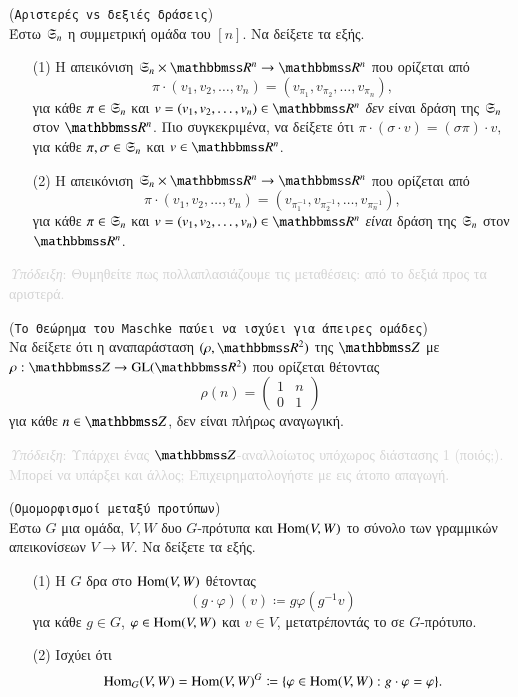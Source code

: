 \documentclass[12pt,a4paper,reqno]{amsart}
\begin{document}
\begin{exercise}{(\texttt{Αριστερές vs δεξιές δράσεις})}
    \\
    Έστω $\mathfrak{S}_n$ η συμμετρική ομάδα του $[n]$. Να δείξετε τα εξής. 
    \begin{itemize}
        \item[(1)] Η απεικόνιση $\fS_n\times\RR^n \to \RR^n$ που ορίζεται από 
        \[
        \pi\cdot(v_1, v_2, \dots, v_n) = (v_{\pi_1},v_{\pi_2}, \dots, v_{\pi_n}),
        \]
        για κάθε $\pi \in \mathfrak{S}_n$ και $v = (v_1, v_2, \dots, v_n) \in \RR^n$ \emph{δεν} είναι δράση της $\mathfrak{S}_n$ στον $\RR^n$. Πιο συγκεκριμένα, να δείξετε ότι 
        $\pi\cdot(\sigma\cdot v) = (\sigma\pi)\cdot v,$
        για κάθε $\pi, \sigma \in \mathfrak{S}_n$ και $v \in \RR^n$.
        \item[(2)] Η απεικόνιση $\fS_n\times\RR^n \to \RR^n$ που ορίζεται από 
        \[
        \pi\cdot(v_1, v_2, \dots, v_n) = (v_{\pi_1^{-1}},v_{\pi_2^{-1}}, \dots, v_{\pi_n^{-1}}),
        \]
        για κάθε $\pi \in \mathfrak{S}_n$ και $v = (v_1, v_2, \dots, v_n) \in \RR^n$ \emph{είναι} δράση της $\mathfrak{S}_n$ στον $\RR^n$.
    \end{itemize}

    \textcolor{lightgray}{\small{\emph{Υπόδειξη}: Θυμηθείτε πως πολλαπλασιάζουμε τις μεταθέσεις: από το δεξιά προς τα αριστερά.}}
\end{exercise}

\begin{exercise}{(\texttt{Το Θεώρημα του Maschke παύει να ισχύει για άπειρες ομάδες})}
    \\
    Να δείξετε ότι η αναπαράσταση $(\rho, \RR^2)$ της $\ZZ$ με $\rho : \ZZ \to \GL(\RR^2)$ που ορίζεται θέτοντας
    \[
    \rho(n) = 
        \begin{pmatrix}
            1 & n \\
            0 & 1
        \end{pmatrix}
    \]
    για κάθε $n \in \ZZ$, δεν είναι πλήρως αναγωγική.

    \textcolor{lightgray}{\small{\emph{Υπόδειξη}: Υπάρχει ένας $\ZZ$-αναλλοίωτος υπόχωρος διάστασης 1 (ποιός;). Μπορεί να υπάρξει και άλλος; Επιχειρηματολογήστε με εις άτοπο απαγωγή.}}
\end{exercise}

\begin{exercise}{(\texttt{Ομομορφισμοί μεταξύ προτύπων})}
    \\
    Έστω $G$ μια ομάδα, $V, W$ δυο $G$-πρότυπα και $\mathrm{Hom}(V,W)$ το σύνολο των γραμμικών απεικο\-νίσεων $V \to W$. Να δείξετε τα εξής.
    \begin{itemize}
        \item[(1)] Η $G$ δρα στο $\mathrm{Hom}(V,W)$ θέτοντας 
        \[
        \left(g \cdot \varphi\right)(v) \coloneqq g\varphi(g^{-1}v)
        \]
        για κάθε $g \in G$, $\varphi \in \mathrm{Hom}(V,W)$ και $v \in V$, μετατρέποντάς το σε $G$-πρότυπο.
        \item[(2)] Ισχύει ότι
        \[
        \mathrm{Hom}_G(V,W) = \mathrm{Hom}(V,W)^G \coloneqq \{\varphi \in \mathrm{Hom}(V,W) : g\cdot\varphi = \varphi\}.
        \] 
    \end{itemize}
\end{exercise}
\end{document}
